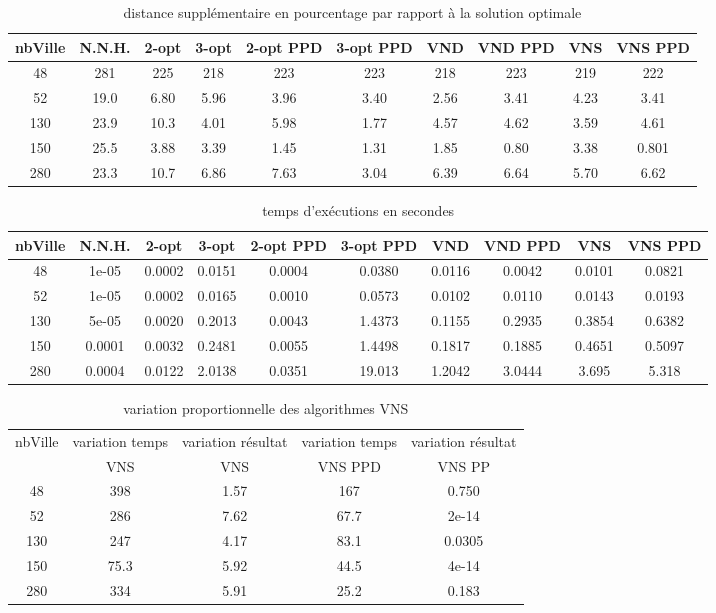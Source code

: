 \documentclass[12pt,a4paper]{article}
\begin{document}
\begin{table}[!h]
\centering
\begin{tabular}{|*{10}{c|}}
  \hline
  nbVille & N.N.H. & 2-opt & 3-opt & 2-opt PPD & 3-opt PPD & VND & VND PPD & VNS & VNS PPD \\
  \hline
  48 & 281 & 225 & 218 & 223 & 223 & 218 & 223 & 219 & 222 \\
  52 & 19.0 & 6.80 & 5.96 & 3.96 & 3.40 & 2.56 & 3.41 & 4.23 & 3.41 \\
  130 & 23.9 & 10.3 & 4.01 & 5.98 & 1.77 & 4.57 & 4.62 & 3.59 & 4.61 \\
  150 & 25.5 & 3.88 & 3.39 & 1.45 & 1.31 & 1.85 & 0.80 & 3.38 & 0.801 \\
  280 & 23.3 & 10.7 & 6.86 & 7.63 & 3.04 & 6.39 & 6.64 & 5.70 & 6.62 \\
  \hline
\end{tabular}
\caption{distance supplémentaire en pourcentage par rapport à la solution optimale}
\label{NNHpourcentageperf}
\end{table}

\begin{table}[!h]
\centering
\begin{tabular}{|*{10}{c|}}
  \hline
  nbVille & N.N.H. & 2-opt & 3-opt & 2-opt PPD & 3-opt PPD & VND & VND PPD & VNS & VNS PPD \\
  \hline
  48 & 1e-05 & 0.0002 & 0.0151 & 0.0004 & 0.0380 & 0.0116 & 0.0042 & 0.0101 & 0.0821 \\
  52 & 1e-05 & 0.0002 & 0.0165 & 0.0010 & 0.0573 & 0.0102 & 0.0110 & 0.0143 & 0.0193 \\
  130 & 5e-05 & 0.0020 & 0.2013 & 0.0043 & 1.4373 & 0.1155 & 0.2935 & 0.3854 & 0.6382 \\
  150 & 0.0001 & 0.0032 & 0.2481 & 0.0055 & 1.4498 & 0.1817 & 0.1885 & 0.4651 & 0.5097 \\
  280 & 0.0004 & 0.0122 & 2.0138 & 0.0351 & 19.013 & 1.2042 & 3.0444 & 3.695 & 5.318 \\ 
  \hline
\end{tabular}
\caption{temps d’exécutions en secondes}
\label{NNHtemps}
\end{table}

\begin{table}[!h]
\centering
\begin{tabular}{|*{5}{c|}}
  \hline
  nbVille & variation temps & variation résultat & variation temps & variation résultat \\
  ~ & VNS & VNS & VNS PPD & VNS PP \\
  \hline
  48 & 398 & 1.57 & 167 & 0.750 \\ 
  52 & 286 & 7.62 & 67.7 & 2e-14 \\
  130 & 247 & 4.17 & 83.1 & 0.0305 \\
  150 & 75.3 & 5.92 & 44.5 & 4e-14 \\
  280 & 334 & 5.91 & 25.2 & 0.183 \\
  \hline
\end{tabular}
\caption{variation proportionnelle des algorithmes VNS}
\label{variationVNSNNH}
\end{table}
\end{document}

